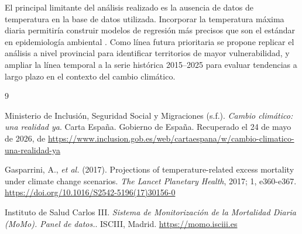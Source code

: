 \documentclass[11pt, a4paper]{article}
\begin{document}
El principal limitante del análisis realizado es la ausencia de datos de
temperatura en la base de datos utilizada. Incorporar la temperatura
máxima diaria permitiría construir modelos de regresión más precisos 
que son el estándar en epidemiología ambiental
\cite{gasparrini2017}. Como línea futura prioritaria se propone replicar
el análisis a nivel provincial para identificar territorios de mayor
vulnerabilidad, y ampliar la línea temporal a la serie histórica
2015--2025 para evaluar tendencias a largo plazo en el contexto del
cambio climático.


\begin{thebibliography}{9}

Ministerio de Inclusi\'{o}n, Seguridad Social y Migraciones (s.f.).
\textit{Cambio clim\'{a}tico: una realidad ya}.
Carta Espa\~{n}a. Gobierno de Espa\~{n}a.
Recuperado el 24 de mayo de 2026, de
\url{https://www.inclusion.gob.es/web/cartaespana/w/cambio-climatico-una-realidad-ya}

Gasparrini, A., \textit{et al.} (2017).
Projections of temperature-related excess mortality under climate change
scenarios. \textit{The Lancet Planetary Health},  2017; 1, e360-e367.
\url{https://doi.org/10.1016/S2542-5196(17)30156-0}

Instituto de Salud Carlos III.
\textit{Sistema de Monitorización de la Mortalidad Diaria (MoMo).
Panel de datos.}. ISCIII, Madrid.
\url{https://momo.isciii.es}

%

\end{thebibliography}
\end{document}
